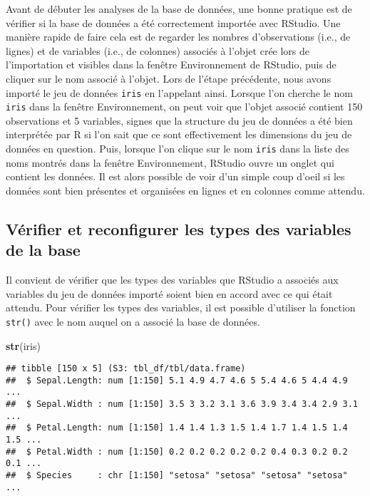 \documentclass[
  french,
]{book}
\newenvironment{Shaded}{\begin{snugshade}}{\end{snugshade}}
\newcommand{\KeywordTok}[1]{\textcolor[rgb]{0.13,0.29,0.53}{\textbf{#1}}}
\newcommand{\NormalTok}[1]{#1}
\begin{document}
Avant de débuter les analyses de la base de données, une bonne pratique est de vérifier si la base de données a été correctement importée avec RStudio. Une manière rapide de faire cela est de regarder les nombres d'observations (i.e., de lignes) et de variables (i.e., de colonnes) associés à l'objet crée lors de l'importation et visibles dans la fenêtre Environnement de RStudio, puis de cliquer sur le nom associé à l'objet. Lors de l'étape précédente, nous avons importé le jeu de données \texttt{iris} en l'appelant ainsi. Lorsque l'on cherche le nom \texttt{iris} dans la fenêtre Environnement, on peut voir que l'objet associé contient 150 observations et 5 variables, signes que la structure du jeu de données a été bien interprétée par R si l'on sait que ce sont effectivement les dimensions du jeu de données en question. Puis, lorsque l'on clique sur le nom \texttt{iris} dans la liste des noms montrés dans la fenêtre Environnement, RStudio ouvre un onglet qui contient les données. Il est alors possible de voir d'un simple coup d'oeil si les données sont bien présentes et organisées en lignes et en colonnes comme attendu.

\hypertarget{vuxe9rifier-et-reconfigurer-les-types-des-variables-de-la-base}{%
\subsection{Vérifier et reconfigurer les types des variables de la base}\label{vuxe9rifier-et-reconfigurer-les-types-des-variables-de-la-base}}

Il convient de vérifier que les types des variables que RStudio a associés aux variables du jeu de données importé soient bien en accord avec ce qui était attendu. Pour vérifier les types des variables, il est possible d'utiliser la fonction \texttt{str()} avec le nom auquel on a associé la base de données.

\begin{Shaded}
\begin{Highlighting}[]
\KeywordTok{str}\NormalTok{(iris)}
\end{Highlighting}
\end{Shaded}

\begin{verbatim}
## tibble [150 x 5] (S3: tbl_df/tbl/data.frame)
##  $ Sepal.Length: num [1:150] 5.1 4.9 4.7 4.6 5 5.4 4.6 5 4.4 4.9 ...
##  $ Sepal.Width : num [1:150] 3.5 3 3.2 3.1 3.6 3.9 3.4 3.4 2.9 3.1 ...
##  $ Petal.Length: num [1:150] 1.4 1.4 1.3 1.5 1.4 1.7 1.4 1.5 1.4 1.5 ...
##  $ Petal.Width : num [1:150] 0.2 0.2 0.2 0.2 0.2 0.4 0.3 0.2 0.2 0.1 ...
##  $ Species     : chr [1:150] "setosa" "setosa" "setosa" "setosa" ...
\end{verbatim}
\end{document}
